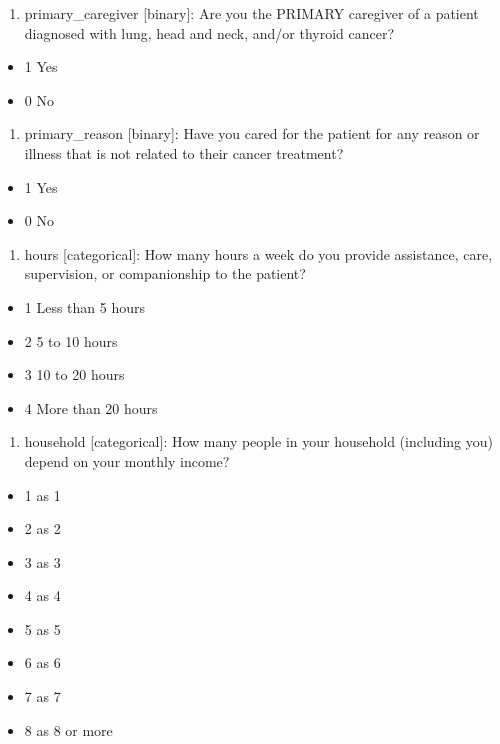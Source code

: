 \documentclass[
  letterpaper,
  DIV=11,
  numbers=noendperiod]{scrreprt}
\providecommand{\tightlist}{%
  \setlength{\itemsep}{0pt}\setlength{\parskip}{0pt}}\usepackage{longtable,booktabs,array}
\begin{document}
\begin{enumerate}
\def\labelenumi{\arabic{enumi}.}
\setcounter{enumi}{7}
\tightlist
\item
  primary\_caregiver {[}binary{]}: Are you the PRIMARY caregiver of a
  patient diagnosed with lung, head and neck, and/or thyroid cancer?
\end{enumerate}

\begin{itemize}
\tightlist
\item
  1 Yes
\item
  0 No
\end{itemize}

\begin{enumerate}
\def\labelenumi{\arabic{enumi}.}
\setcounter{enumi}{8}
\tightlist
\item
  primary\_reason {[}binary{]}: Have you cared for the patient for any
  reason or illness that is not related to their cancer treatment?
\end{enumerate}

\begin{itemize}
\tightlist
\item
  1 Yes
\item
  0 No
\end{itemize}

\begin{enumerate}
\def\labelenumi{\arabic{enumi}.}
\setcounter{enumi}{9}
\tightlist
\item
  hours {[}categorical{]}: How many hours a week do you provide
  assistance, care, supervision, or companionship to the patient?
\end{enumerate}

\begin{itemize}
\tightlist
\item
  1 Less than 5 hours
\item
  2 5 to 10 hours
\item
  3 10 to 20 hours
\item
  4 More than 20 hours
\end{itemize}

\begin{enumerate}
\def\labelenumi{\arabic{enumi}.}
\setcounter{enumi}{10}
\tightlist
\item
  household {[}categorical{]}: How many people in your household
  (including you) depend on your monthly income?
\end{enumerate}

\begin{itemize}
\tightlist
\item
  1 as 1
\item
  2 as 2
\item
  3 as 3
\item
  4 as 4
\item
  5 as 5
\item
  6 as 6
\item
  7 as 7
\item
  8 as 8 or more
\end{itemize}
\end{document}

